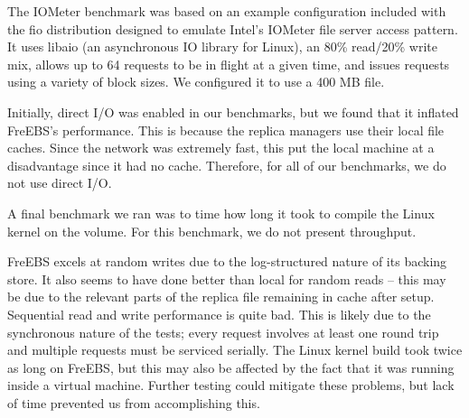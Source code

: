 The IOMeter benchmark was based on an example configuration included with the fio distribution designed to emulate Intel's IOMeter file server access pattern. It uses libaio (an asynchronous IO library for Linux), an 80\% read/20\% write mix, allows up to 64 requests to be in flight at a given time, and issues requests using a variety of block sizes. We configured it to use a 400 MB file.

Initially, direct I/O was enabled in our benchmarks, but we found that it inflated FreEBS's performance. This is because the replica managers use their local file caches. Since the network was extremely fast, this put the local machine at a disadvantage since it had no cache. Therefore, for all of our benchmarks, we do not use direct I/O.

A final benchmark we ran was to time how long it took to compile the Linux kernel on the volume. For this benchmark, we do not present throughput.

FreEBS excels at random writes due to the log-structured nature of its backing store. It also seems to have done better than local for random reads -- this may be due to the relevant parts of the replica file remaining in cache after setup. Sequential read and write performance is quite bad. This is likely due to the synchronous nature of the tests; every request involves at least one round trip and multiple requests must be serviced serially. The Linux kernel build took twice as long on FreEBS, but this may also be affected by the fact that it was running inside a virtual machine. Further testing could mitigate these problems, but lack of time prevented us from accomplishing this.